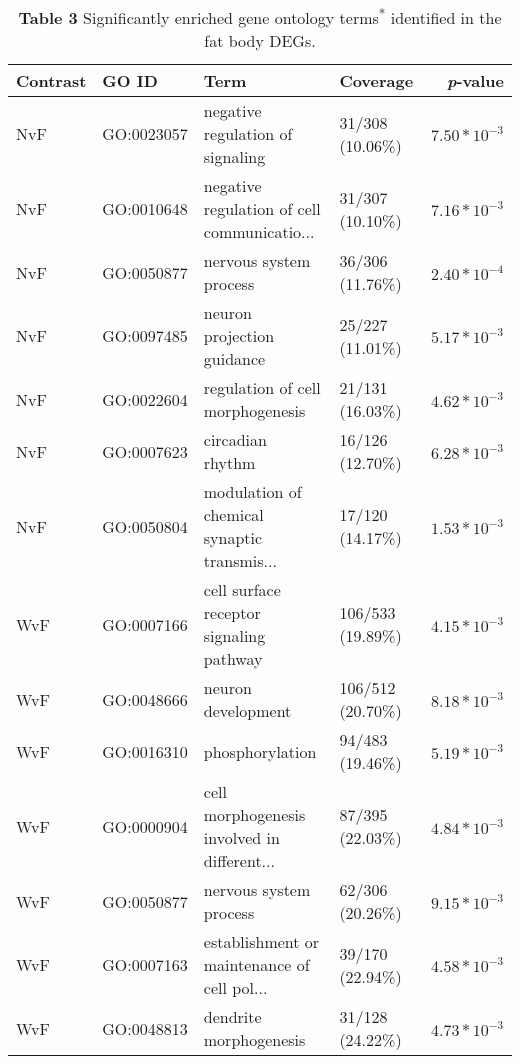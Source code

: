 \documentclass[landscape, 12pt]{article}
\begin{document}
\pagebreak

\begin{table}
\centering
\begin{threeparttable}
\caption*{\textbf{Table 3}	\quad Significantly enriched gene ontology terms\textsuperscript{*} identified in the fat body DEGs.}
\begin{tabular}{llllr} 
\rowcolor[rgb]{0.804,0.8,0.8} \textbf{Contrast} & \textbf{GO ID} & \textbf{Term} & \textbf{Coverage} & \textbf{\textit{p}-value}  \\ 
\hline
  NvF & GO:0023057 & negative regulation of signaling & 31/308 (10.06\%) & $7.50*10^{-3}$ \\ 
  NvF & GO:0010648 & negative regulation of cell communicatio... & 31/307 (10.10\%) & $7.16*10^{-3}$ \\ 
  NvF & GO:0050877 & nervous system process & 36/306 (11.76\%) & $2.40*10^{-4}$ \\ 
  NvF & GO:0097485 & neuron projection guidance & 25/227 (11.01\%) & $5.17*10^{-3}$ \\ 
  NvF & GO:0022604 & regulation of cell morphogenesis & 21/131 (16.03\%) & $4.62*10^{-3}$ \\ 
  NvF & GO:0007623 & circadian rhythm & 16/126 (12.70\%) & $6.28*10^{-3}$ \\ 
  NvF & GO:0050804 & modulation of chemical synaptic transmis... & 17/120 (14.17\%) & $1.53*10^{-3}$ \\ 
  \rowcolor[rgb]{0.949,0.949,0.953} WvF & GO:0007166 & cell surface receptor signaling pathway & 106/533 (19.89\%) & $4.15*10^{-3}$ \\ 
  \rowcolor[rgb]{0.949,0.949,0.953} WvF & GO:0048666 & neuron development & 106/512 (20.70\%) & $8.18*10^{-3}$ \\ 
  \rowcolor[rgb]{0.949,0.949,0.953} WvF & GO:0016310 & phosphorylation & 94/483 (19.46\%) & $5.19*10^{-3}$ \\ 
  \rowcolor[rgb]{0.949,0.949,0.953} WvF & GO:0000904 & cell morphogenesis involved in different... & 87/395 (22.03\%) & $4.84*10^{-3}$ \\ 
  \rowcolor[rgb]{0.949,0.949,0.953} WvF & GO:0050877 & nervous system process & 62/306 (20.26\%) & $9.15*10^{-3}$ \\ 
  \rowcolor[rgb]{0.949,0.949,0.953} WvF & GO:0007163 & establishment or maintenance of cell pol... & 39/170 (22.94\%) & $4.58*10^{-3}$ \\ 
  \rowcolor[rgb]{0.949,0.949,0.953} WvF & GO:0048813 & dendrite morphogenesis & 31/128 (24.22\%) & $4.73*10^{-3}$ \\ 

\end{tabular}
\end{threeparttable}
\end{table}
\end{document}
